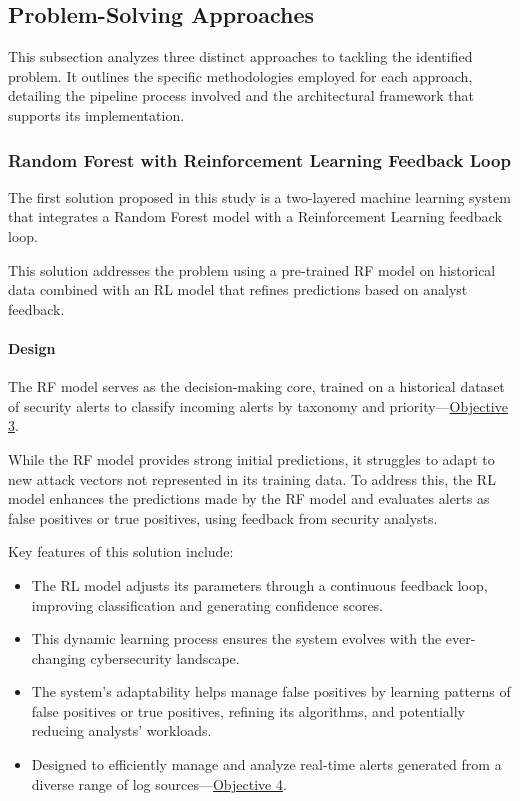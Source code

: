 \subsection{Problem-Solving Approaches}
This subsection analyzes three distinct approaches to tackling the identified problem. 
It outlines the specific methodologies employed for each approach, detailing the pipeline process involved and the architectural framework that supports its implementation.

\subsubsection{Random Forest with Reinforcement Learning Feedback Loop}

The first solution proposed in this study is a two-layered machine learning system that integrates a Random Forest model with a Reinforcement Learning feedback loop. 

This solution addresses the problem using a pre-trained RF model on historical data combined with an RL model that refines predictions based on analyst feedback.

\paragraph{Design} 

The RF model serves as the decision-making core, trained on a historical dataset of security alerts to classify incoming alerts by taxonomy and priority—\hyperref[objective3]{Objective 3}.

While the RF model provides strong initial predictions, it struggles to adapt to new attack vectors not represented in its training data. 
To address this, the RL model enhances the predictions made by the RF model and evaluates alerts as false positives or true positives, using feedback from security analysts.

Key features of this solution include:

\begin{itemize}
    \item The RL model adjusts its parameters through a continuous feedback loop, improving classification and generating confidence scores.
    \item This dynamic learning process ensures the system evolves with the ever-changing cybersecurity landscape.
    \item The system's adaptability helps manage false positives by learning patterns of false positives or true positives, refining its algorithms, and potentially reducing analysts' workloads.
    \item Designed to efficiently manage and analyze real-time alerts generated from a diverse range of log sources—\hyperref[objective4]{Objective 4}.
\end{itemize}

